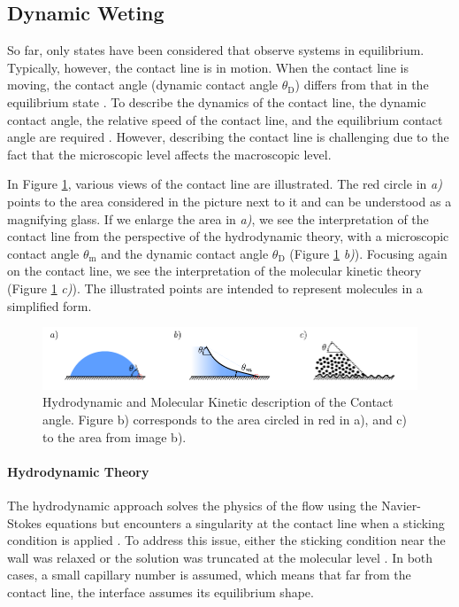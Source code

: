 \subsection{Dynamic Weting}
So far, only states have been considered that observe systems in equilibrium. Typically, however, the contact line is in motion. When the contact line is moving, the contact angle (dynamic contact angle $\theta_{\mathrm{D}}$) differs from that in the equilibrium state \cite{blake2006PhysicsMovingWetting}. To describe the dynamics of the contact line, the dynamic contact angle, the relative speed of the contact line, and the equilibrium contact angle are required \cite{mohammadkarim2022ReviewPhysicsMoving, blake2006PhysicsMovingWetting, cox1986DynamicsSpreadingLiquids,huh1971HydrodynamicModelSteady,voinovHydrodynamicsWetting1977}. However, describing the contact line is challenging due to the fact that the microscopic level affects the macroscopic level.

In Figure \ref{fig: HDT_MKT_comp}, various views of the contact line are illustrated. The red circle in \textit{a)} points to the area considered in the picture next to it and can be understood as a magnifying glass. If we enlarge the area in \textit{a)}, we see the interpretation of the contact line from the perspective of the hydrodynamic theory, with a microscopic contact angle $\theta_{\mathrm{m}}$ and the dynamic contact angle $\theta_{\mathrm{D}}$ (Figure \ref{fig: HDT_MKT_comp} \textit{b)}). Focusing again on the contact line, we see the interpretation of the molecular kinetic theory (Figure \ref{fig: HDT_MKT_comp} \textit{c)}). The illustrated points are intended to represent molecules in a simplified form.




\begin{figure}[h]
    \centering
    \includegraphics[width=.95\textwidth]{Pictures/ContactAngles_HDT_MKT.pdf}
    \caption{Hydrodynamic and Molecular Kinetic description of the Contact angle. Figure b) corresponds to the area circled in red in a), and c) to the area from image b).}
    \label{fig: HDT_MKT_comp}
\end{figure}

\paragraph{Hydrodynamic Theory}
\label{paragraph: hydrodynTheory}
The hydrodynamic approach solves the physics of the flow using the Navier-Stokes equations but encounters a singularity at the contact line when a sticking condition is applied \cite{huh1971HydrodynamicModelSteady}. To address this issue, either the sticking condition near the wall was relaxed or the solution was truncated at the molecular level \cite{blake2006PhysicsMovingWetting}. In both cases, a small capillary number is assumed, which means that far from the contact line, the interface assumes its equilibrium shape.

